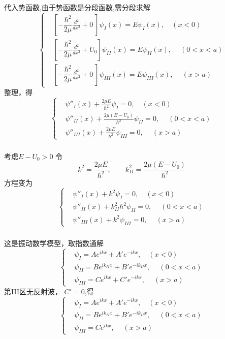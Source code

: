 \begin{frame}
  \frametitle{}
  代入势函数,由于势函数是分段函数,需分段求解
  \[\left\{\begin{aligned}
      &\left [ -\dfrac{\hbar^2}{2\mu } \frac{d^2 }{d x^2} + 0 ~\right ]\psi _{I}(x)  = E \psi_{I}(x), \quad ( x < 0) \\
      &\left [ -\dfrac{\hbar^2}{2\mu } \frac{d^2 }{d x^2} + U_0 \right ]\psi_{II}(x)  = E \psi_{II}(x) ,\quad~ (  0< x < a) \\
      &\left [ -\dfrac{\hbar^2}{2\mu } \frac{d^2 }{d x^2} + 0~ \right ]\psi_{III}(x) = E \psi_{III}(x),\quad~ ( x > a)
  \end{aligned}\right.\]
  整理，得
  \[\left\{\begin{aligned}
    &\psi'' _{I}(x) +  \frac{2\mu E}{\hbar^2} \psi_{I} = 0, \quad ( x < 0) \\
    & \psi'' _{II}(x) +  \frac{2\mu (E-U_0)}{\hbar^2} \psi_{II} = 0 ,\quad~ (  0< x < a) \\
    &\psi'' _{III}(x) +  \frac{2\mu E}{\hbar^2} \psi_{III} = 0,\quad~ ( x > a)
\end{aligned}\right.\]  
\end{frame} 

\begin{frame}
  \frametitle{}
考虑$E-U_0 > 0$ 令 
\[ k^2=\frac{2\mu E}{\hbar^2}, \qquad  k^2_{II}=\frac{2\mu (E-U_0)}{\hbar^2} \]
方程变为
\[\left\{\begin{aligned}
    &\psi'' _{I}(x) +  k^2 \psi_{I} = 0, \quad ( x < 0) \\
    & \psi'' _{II}(x) +  k^2_{II}{\hbar^2} \psi_{II} = 0 ,\quad~ (  0< x < a) \\
    &\psi'' _{III}(x) +  k^2\psi_{III} = 0,\quad~ ( x > a)
\end{aligned}\right.\] 
\end{frame} 

\begin{frame}
  \frametitle{}
  这是振动数学模型，取指数通解
  \[\left\{\begin{aligned}
    &\psi _{I} = A e^{ikx} + A' e^{-ikx}, \quad ( x < 0) \\
    & \psi _{II} = B e^{ik_{II}x} + B' e^{-ik_{II}x} ,\quad~ (  0< x < a) \\
    &\psi_{III}= C e^{ikx} + C' e^{-ikx},\quad~ ( x > a)
\end{aligned}\right.\] 
第III区无反射波， $C'=0$,得
\begin{equation}\label{eq:tunn}
 \left\{\begin{aligned}
  &\psi _{I} = A e^{ikx} + A' e^{-ikx}, \quad ( x < 0) \\
  & \psi _{II} = B e^{ik_{II}x} + B' e^{-ik_{II}x} ,\quad~ (  0< x < a) \\
  &\psi_{III}= C e^{ikx},\quad~ ( x > a)
\end{aligned}\right.   
\end{equation}
\end{frame} 

